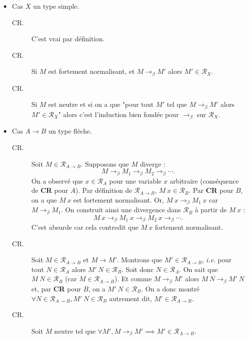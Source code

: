 \documentclass[./main]{subfiles}
\begin{document}
\begin{prv}
    \begin{itemize}
      \item Cas $X$ un type simple.
        \begin{description}
          \item[CR.] C'est vrai par définition.
          \item[CR.] Si $M$ est fortement normalisant, et $M \to_\beta M'$ alors $M' \in \mathcal{R}_X$.
          \item[CR.] Si $M$ est neutre et si on a que "pour tout $M'$ tel que $M \to_\beta M'$ alors $M' \in \mathcal{R}_X$" alors c'est l'induction bien fondée pour $\to_\beta$ sur $\mathcal{R}_X$.
        \end{description}
      \item Cas $A \to B$ un type flèche.
        \begin{description}
          \item[CR.] Soit $M \in \mathcal{R}_{A \to B}$.
            Supposons que $M$ diverge :
            \[
            M\to_\beta M_1 \to_\beta  M_2 \to_\beta \cdots 
            .\]
            On a observé que $x \in \mathcal{R}_A$ pour une variable $x$ arbitraire (conséquence de \textbf{\textsf{CR}} pour $A$).
            Par définition de $\mathcal{R}_{A \to B}$, $M\: x \in \mathcal{R}_B$.
            Par \textbf{\textsf{CR}} pour $B$, on a que $M \: x$ est fortement normalisant.
            Or,  $M \: x \to_\beta M_1 \: x$ car $M \to_\beta M_1$.
            On construit ainsi une divergence dans $\mathcal{R}_B$ à partir de $M\:x$ :
             \[
            M\: x \to_\beta M_1 \: x \to_\beta M_2 \: x \to_\beta\cdots 
            .\] 
            C'est absurde car cela contredit que $M\:x$ fortement normalisant.
          \item[CR.]
            Soit $M \in \mathcal{R}_{A \to B}$ et $M \to M'$.
            Montrons que $M' \in \mathcal{R}_{A \to B}$, \textit{i.e.} pour tout $N \in \mathcal{R}_A$ alors $M' \: N \in \mathcal{R}_B$.
            Soit donc $N \in \mathcal{R}_A$.
            On sait que $M\:N \in \mathcal{R}_B$ (car $M \in \mathcal{R}_{A \to B}$).
            Et comme $M \to_\beta M'$ alors $M \: N \to_\beta M' \: N$ et, par \textbf{\textsf{CR}} pour $B$, on a $M' \: N \in \mathcal{R}_B$.
            On a donc montré $\forall N \in \mathcal{R}_{A \to B}, M'\: N \in \mathcal{R}_B$ autrement dit, $M' \in \mathcal{R}_{A \to B}$.
          \item[CR.]
            Soit $M$ neutre tel que $\forall M', M \to_\beta M' \implies M' \in \mathcal{R}_{A \to B}$.

\end{description}
\end{itemize}
\end{prv}
\end{document}
